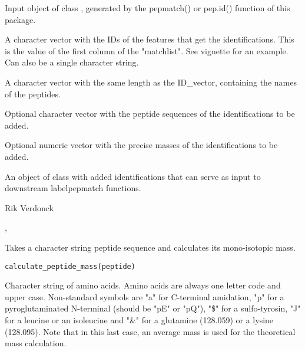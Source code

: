 \documentclass[letterpaper]{book}
\begin{document}
%
\begin{Arguments}
\begin{ldescription}
\item[\code{pepmatched}] Input object of class , generated by the pepmatch() or pep.id() function of this package.

\item[\code{ID\_vector}] A character vector with the IDs of the features that get the identifications. This is the value of the first column of the "matchlist". See vignette for an example. Can also be a single character string.

\item[\code{name\_vector}] A character vector with the same length as the ID\_vector, containing the names of the peptides.

\item[\code{pepseq\_vector}] Optional character vector with the peptide sequences of the identifications to be added.

\item[\code{pepmass\_vector}] Optional numeric vector with the precise masses of the identifications to be added.
\end{ldescription}
\end{Arguments}
%
\begin{Value}
An object of class  with added identifications that can serve as input to downstream labelpepmatch functions.
\end{Value}
%
\begin{Author}\relax
Rik Verdonck
\end{Author}
%
\begin{SeeAlso}\relax
{}, 
\end{SeeAlso}
%
\begin{Description}\relax
Takes a character string peptide sequence and calculates its mono-isotopic mass.
\end{Description}
%
\begin{Usage}
\begin{verbatim}
calculate_peptide_mass(peptide)
\end{verbatim}
\end{Usage}
%
\begin{Arguments}
\begin{ldescription}
\item[\code{peptide}] Character string of amino acids. Amino acids are always one letter code and upper case. Non-standard symbols are "a" for C-terminal amidation, "p" for a pyroglutaminated N-terminal (should be "pE" or "pQ"), "\$" for a sulfo-tyrosin, "J" for a leucine or an isoleucine and "\&" for a glutamine (128.059) or a lysine (128.095). Note that in this last case, an average mass is used for the theoretical mass calculation.
\end{ldescription}
\end{Arguments}
\end{document}
